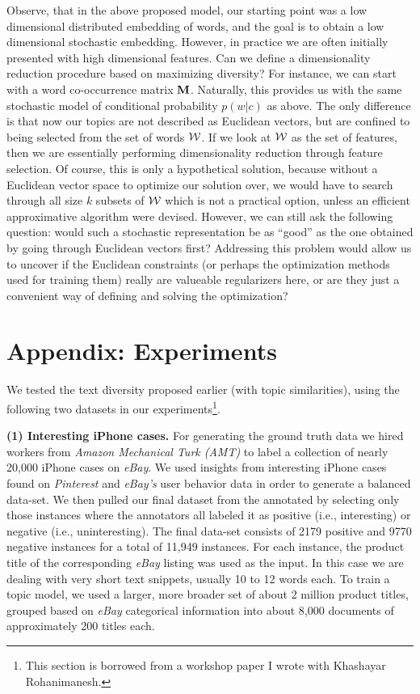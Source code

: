 \documentclass{article} %
\begin{document}
Observe, that in the above proposed model, our starting point was a low
dimensional distributed embedding of words, and the goal is to obtain
a low dimensional stochastic embedding. However, in practice we are
often initially presented with high dimensional features. Can we
define a dimensionality reduction procedure based on maximizing
diversity? For instance, we can start with a word co-occurrence matrix
$\operatorname{\mathbf{M}}$. Naturally, this provides us with the same stochastic model of
conditional probability $p(w|c)$ as above. The only difference is that
now our topics are not described as Euclidean vectors, but are
confined to being selected from the set of words ${\mathcal W}$. If we look at
${\mathcal W}$ as the set of features, then we are essentially performing
dimensionality reduction through feature selection. Of course, this is
only a hypothetical solution, because without a Euclidean vector space
to optimize our solution over, we would have to search through all
size $k$ subsets of ${\mathcal W}$ which is not a practical option, unless
an efficient approximative algorithm were devised. However, we can
still ask the following question: would such a stochastic
representation be as ``good'' as the one obtained by
going through Euclidean vectors first? Addressing this problem would
allow us to uncover if the Euclidean constraints (or perhaps the
optimization methods used for training them) really are valueable
regularizers here, or are they just a convenient way of defining and
solving the optimization? 

\section{Appendix: Experiments}
\label{sec:experiments}

We tested the text diversity proposed earlier (with topic similarities),
using the following two datasets in our experiments\footnote{This
  section is borrowed from a workshop paper I wrote with Khashayar
  Rohanimanesh.}.  

{\bf (1) Interesting iPhone cases.} 
For generating the ground truth data we hired workers from {\em Amazon
  Mechanical Turk (AMT)} to label a collection 
of nearly 20,000 iPhone cases on {\em eBay}. We used insights from
interesting iPhone cases found on {\em Pinterest} and {\em eBay's} user behavior data in order to generate a balanced data-set. 
We then pulled our final dataset from the annotated by selecting only those instances where the annotators all labeled it as
positive (i.e., interesting) or negative (i.e., uninteresting). The final data-set consists of 2179 positive and 9770 negative instances for
a total of 11,949 instances. For each instance, the product title of
the corresponding {\em eBay} listing was used as the input. In this case we are
dealing with very short text snippets, usually 10 to 12 words each. To
train a topic model, we used a larger, more broader set of about
2 million product titles, grouped based on {\em eBay} categorical information into about 8,000
documents of approximately 200 titles each.
\end{document}
